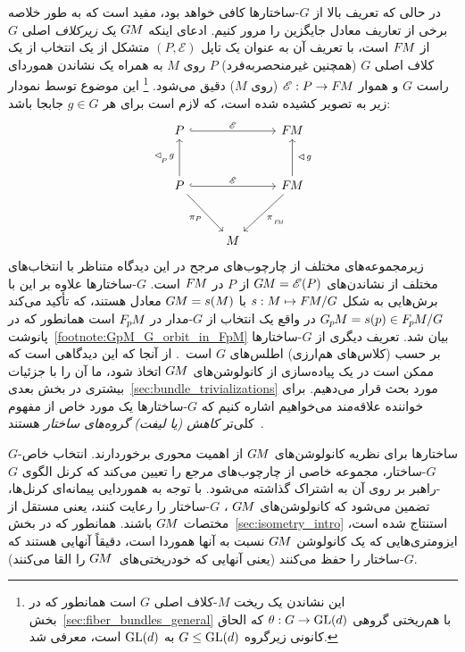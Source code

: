 در حالی که تعریف بالا از $G$-ساختارها کافی خواهد بود، مفید است که به طور خلاصه برخی از تعاریف معادل جایگزین را مرور کنیم.
ادعای اینکه $G\mkern-1.4muM$ یک \emph{زیرکلاف} اصلی $G$ از $F\mkern-1.5muM$ است، با تعریف آن به عنوان یک تاپل $(P, \mathscr{E})$ متشکل از یک انتخاب از یک کلاف اصلی $G$ (همچنین غیرمنحصربه‌فرد) $P$ روی $M$ به همراه یک نشاندن هموردای راست $G$ و هموار $\mathscr{E}: P \to F\mkern-1.5muM$ (روی $M$) دقیق می‌شود.%
\footnote{
	این نشاندن یک ریخت $M$-کلاف اصلی $G$ است همانطور که در بخش~\ref{sec:fiber_bundles_general} با هم‌ریختی گروهی $\theta:G\to\operatorname{GL}(d)$ که الحاق کانونی زیرگروه $G\leq\operatorname{GL}(d)$ به $\operatorname{GL}(d)$ است، معرفی شد.
}
این موضوع توسط نمودار زیر به تصویر کشیده شده است، که لازم است برای هر $g\in G$ جابجا باشد:
\begin{equation}\label{cd:GM_def_embedding}
	\begin{tikzcd}[row sep=3.em, column sep=2.5em]
		P
		\arrow[rr, "\mathscr{E}", hook]
		&& \FM
		\\
		P
		\arrow[rr, "\mathscr{E}", hook]
		\arrow[u, "\lhd_{\overset{}{\mkern-2muP}}\mkern2mu g\:"]
		\arrow[dr, "\pi_P"']
		&& \FM
		\arrow[u, "\:\lhd\mkern2mu g"']
		\arrow[dl, "\piFM"]
		\\
		& M
	\end{tikzcd}
\end{equation}
زیرمجموعه‌های مختلف از چارچوب‌های مرجح در این دیدگاه متناظر با انتخاب‌های مختلف از نشاندن‌های ${G\mkern-1.4muM = \mathscr{E}(P)}$ از $P$ در $F\mkern-1.5muM$ است.
$G$-ساختارها علاوه بر این با برش‌هایی به شکل $s: M \mapsto F\mkern-1.5muM/G$ با $G\mkern-1.4muM = s(M)$ معادل هستند، که تأکید می‌کند $G_{\mkern-1.3mu p}\mkern-1.2muM = s(p) \in F_{\mkern-1.5mu p}\mkern-1.0muM/G$ در واقع یک انتخاب از $G$-مدار در $F_{\mkern-1.5mu p}\mkern-1.0muM$ است همانطور که در پانوشت~\ref{footnote:GpM_G_orbit_in_FpM} بیان شد.
تعریف دیگری از $G$-ساختارها بر حسب (کلاس‌های هم‌ارزی) اطلس‌های $G$ است~\cite{wendlLectureNotesBundles2008}.
از آنجا که این دیدگاهی است که ممکن است در یک پیاده‌سازی از کانولوشن‌های $G\mkern-1.4muM$ اتخاذ شود، ما آن را با جزئیات بیشتری در بخش بعدی~\ref{sec:bundle_trivializations} مورد بحث قرار می‌دهیم.
برای خواننده علاقه‌مند می‌خواهیم اشاره کنیم که $G$-ساختارها یک مورد خاص از مفهوم کلی‌تر \emph{کاهش (یا لیفت) گروه‌های ساختار} هستند~\cite{sternberg1999lectures,piccione2006theory,crainic2013GStructuresExamples}.


$G$-ساختارها برای نظریه کانولوشن‌های $G\mkern-1.4muM$ از اهمیت محوری برخوردارند.
انتخاب خاص $G$-ساختار، مجموعه خاصی از چارچوب‌های مرجع را تعیین می‌کند که کرنل الگوی $G$-راهبر بر روی آن به اشتراک گذاشته می‌شود.
با توجه به هموردایی پیمانه‌ای کرنل‌ها، تضمین می‌شود که کانولوشن‌های $G\mkern-1.4muM$ ، $G$-ساختار را رعایت کنند، یعنی مستقل از مختصات $G\mkern-1.4muM$ باشند.
همانطور که در بخش~\ref{sec:isometry_intro} استنتاج شده است، ایزومتری‌هایی که یک کانولوشن $G\mkern-1.4muM$ نسبت به آنها هموردا است، دقیقاً آنهایی هستند که $G$-ساختار را حفظ می‌کنند (یعنی آنهایی که خودریختی‌های~$G\mkern-1.4muM$ را القا می‌کنند).


